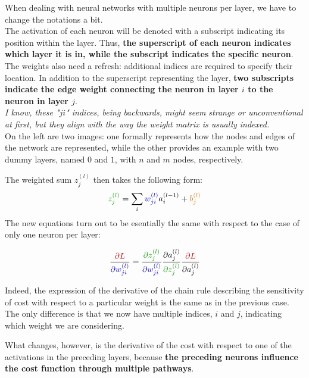 \begin{minipage}{0.55\textwidth}
When dealing with neural networks with multiple neurons per layer, we have to change the notations a bit.\\

The activation of each neuron will be denoted with a subscript indicating its position within the layer. Thus, \textbf{the superscript of each neuron indicates which layer it is in, while the subscript indicates the specific neuron}.\\

The weights also need a refresh: additional indices are required to specify their location. In addition to the superscript representing the layer, \textbf{two subscripts indicate the edge weight connecting the neuron in layer $i$ to the neuron in layer $j$}.\\

\textit{I know, these "$ji$" indices, being backwards, might seem strange or unconventional at first, but they align with the way the weight matrix is usually indexed.}\\

On the left are two images: one formally represents how the nodes and edges of the network are represented, while the other provides an example with two dummy layers, named $0$ and $1$, with $n$ and $m$ nodes, respectively.
\end{minipage}

\newpage
The weighted sum \textcolor{mygreen}{$z_{j}^{(l)}$} then takes the following form:
$$
\textcolor{mygreen}{z_{j}^{(l)}} = \sum_{i} \textcolor{myblue}{w_{ji}^{(l)}} a_i^{(l-1)} + \textcolor{myorange}{b_{j}^{(l)}}
$$
The new equations turn out to be esentially the same with respect to the case of only one neuron per layer:

\vspace{-0.4cm}
$$
\frac{\textcolor{myred}{\partial L}}{\textcolor{myblue}{\partial w_{ji}^{(l)}}} = \frac{\textcolor{mygreen}{\partial z_{j}^{(l)}}}{\textcolor{myblue}{\partial w_{ji}^{(l)}}}  
\frac{\partial a_{j}^{(l)}}{\textcolor{mygreen}{\partial z_{j}^{(l)}}} \frac{\textcolor{myred}{\partial L}}{\partial a_{j}^{(l)}}
$$

Indeed, the expression of the derivative of the chain rule describing the sensitivity of cost with respect to a particular weight is the same as in the previous case. The only difference is that we now have multiple indices, $i$ and $j$, indicating which weight we are considering.

What changes, however, is the derivative of the cost with respect to one of the activations in the preceding layers, because \textbf{the preceding neurons influence the cost function through multiple pathways}.

